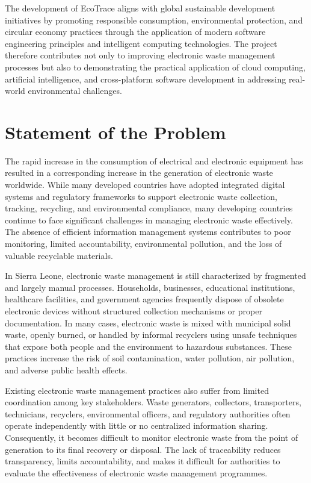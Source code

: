 The development of EcoTrace aligns with global sustainable development
initiatives by promoting responsible consumption, environmental protection, and
circular economy practices through the application of modern software engineering
principles and intelligent computing technologies. The project therefore contributes
not only to improving electronic waste management processes but also to
demonstrating the practical application of cloud computing, artificial intelligence, and
cross-platform software development in addressing real-world environmental
challenges.

\section{Statement of the Problem}
\label{sec:problem-statement}

The rapid increase in the consumption of electrical and electronic equipment has
resulted in a corresponding increase in the generation of electronic waste worldwide.
While many developed countries have adopted integrated digital systems and
regulatory frameworks to support electronic waste collection, tracking, recycling, and
environmental compliance, many developing countries continue to face significant
challenges in managing electronic waste effectively. The absence of efficient
information management systems contributes to poor monitoring, limited
accountability, environmental pollution, and the loss of valuable recyclable materials.

In Sierra Leone, electronic waste management is still characterized by
fragmented and largely manual processes. Households, businesses, educational
institutions, healthcare facilities, and government agencies frequently dispose of
obsolete electronic devices without structured collection mechanisms or proper
documentation. In many cases, electronic waste is mixed with municipal solid waste,
openly burned, or handled by informal recyclers using unsafe techniques that expose
both people and the environment to hazardous substances. These practices increase
the risk of soil contamination, water pollution, air pollution, and adverse public health
effects.

Existing electronic waste management practices also suffer from limited
coordination among key stakeholders. Waste generators, collectors, transporters,
technicians, recyclers, environmental officers, and regulatory authorities often operate
independently with little or no centralized information sharing. Consequently, it
becomes difficult to monitor electronic waste from the point of generation to its final
recovery or disposal. The lack of traceability reduces transparency, limits
accountability, and makes it difficult for authorities to evaluate the effectiveness of
electronic waste management programmes.


